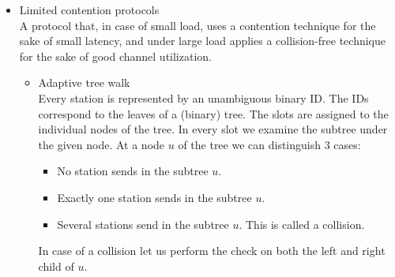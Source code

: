 \documentclass[margin=0px]{article}
\begin{document}
\begin{description}
\begin{description}
\begin{itemize}
                          There are N stations. The stations are unambiguously numbered from 0 to N. We assume a slotted time model.
                          \begin{itemize}
                              \item A reservation protocol \\
                                    If the i-th station wants to send, then in the i-th contention slot it can indicate this by sending a 1 bit. Thus by the end of the contention period every station knows the senders. The sending happens in the order of the sequence numbers.
                              \item Binary countdown protocol \\
                                    Every station has a binary identifier of equal length. The station wishing to transmit begins to send its binary address bit by bit, starting with the highest-place-value bit. The bits of the same position enter into a logical OR connection in case of a collision. If the station sends a zero but hears back a one, then it gives up its sending intention, because there is a sender with a larger identifier than it.
                          \end{itemize}
                    \item Limited contention protocols \\
                          A protocol that, in case of small load, uses a contention technique for the sake of small latency, and under large load applies a collision-free technique for the sake of good channel utilization.
                          \begin{itemize}
                              \item Adaptive tree walk \\
                                    Every station is represented by an unambiguous binary ID. The IDs correspond to the leaves of a (binary) tree. The slots are assigned to the individual nodes of the tree. In every slot we examine the subtree under the given node. At a node $u$ of the tree we can distinguish 3 cases:
                                    \begin{itemize}
                                        \item No station sends in the subtree $u$.
                                        \item Exactly one station sends in the subtree $u$.
                                        \item Several stations send in the subtree $u$. This is called a collision.
                                    \end{itemize}
                                    In case of a collision let us perform the check on both the left and right child of $u$.


\end{itemize}
\end{itemize}
\end{description}
\end{description}
\end{document}
